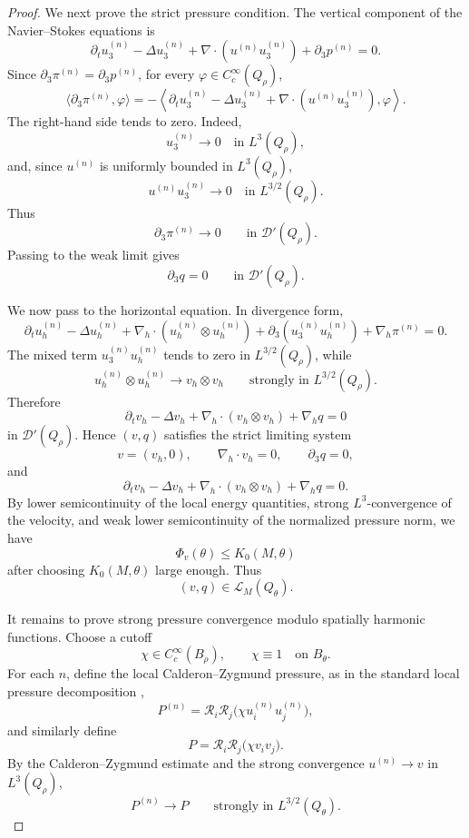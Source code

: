 \documentclass[11pt]{article}
\numberwithin{equation}{section}
\theoremstyle{plain}
\theoremstyle{definition}
\theoremstyle{remark}
\newcommand{\nabh}{\nabla_h}
\newcommand{\divh}{\nabla_h\!\cdot}
\newcommand{\calL}{\mathcal L}
\newcommand{\calR}{\mathcal R}
\begin{document}
\begin{proof}
We next prove the strict pressure condition.  The vertical component of the Navier--Stokes equations is
\[
        \partial_tu^{(n)}_3-\Delta u^{(n)}_3
        +\nabla\cdot(u^{(n)}u^{(n)}_3)
        +\partial_3p^{(n)}=0 .
\]
Since \(\partial_3\pi^{(n)}=\partial_3p^{(n)}\), for every \(\varphi\in C_c^\infty(Q_\rho)\),
\[
        \langle \partial_3\pi^{(n)},\varphi\rangle
        =
        -\left\langle
        \partial_tu^{(n)}_3-\Delta u^{(n)}_3
        +\nabla\cdot(u^{(n)}u^{(n)}_3),
        \varphi
        \right\rangle .
\]
The right-hand side tends to zero.  Indeed,
\[
        u^{(n)}_3\to0 \quad\text{in }L^3(Q_\rho),
\]
and, since \(u^{(n)}\) is uniformly bounded in \(L^3(Q_\rho)\),
\[
        u^{(n)}u^{(n)}_3\to0
        \quad\text{in }L^{3/2}(Q_\rho).
\]
Thus
\[
        \partial_3\pi^{(n)}\to0
        \qquad\text{in }\mathcal D'(Q_\rho).
\]
Passing to the weak limit gives
\[
        \partial_3q=0
        \qquad\text{in }\mathcal D'(Q_\rho).
\]

We now pass to the horizontal equation.  In divergence form,
\[
        \partial_tu^{(n)}_h-\Delta u^{(n)}_h
        +\divh(u^{(n)}_h\otimes u^{(n)}_h)
        +\partial_3(u^{(n)}_3u^{(n)}_h)
        +\nabh\pi^{(n)}=0 .
\]
The mixed term \(u^{(n)}_3u^{(n)}_h\) tends to zero in \(L^{3/2}(Q_\rho)\), while
\[
        u^{(n)}_h\otimes u^{(n)}_h
        \to
        v_h\otimes v_h
        \qquad\text{strongly in }L^{3/2}(Q_\rho).
\]
Therefore
\[
        \partial_tv_h-\Delta v_h
        +\divh(v_h\otimes v_h)
        +\nabh q=0
\]
in \(\mathcal D'(Q_\rho)\).  Hence \((v,q)\) satisfies the strict limiting system
\[
        v=(v_h,0),
        \qquad
        \divh v_h=0,
        \qquad
        \partial_3q=0,
\]
and
\[
        \partial_tv_h-\Delta v_h
        +\divh(v_h\otimes v_h)
        +\nabh q=0 .
\]
By lower semicontinuity of the local energy quantities, strong \(L^3\)-convergence of the velocity, and weak lower semicontinuity of the normalized pressure norm, we have
\[
        \Phi_v(\theta)\le K_0(M,\theta)
\]
after choosing \(K_0(M,\theta)\) large enough.  Thus
\[
        (v,q)\in\calL_M(Q_\theta).
\]

It remains to prove strong pressure convergence modulo spatially harmonic functions.  Choose a cutoff
\[
        \chi\in C_c^\infty(B_\rho),
        \qquad
        \chi\equiv1 \quad\text{on }B_\theta .
\]
For each \(n\), define the local Calderon--Zygmund pressure, as in the standard local pressure decomposition \cite{SohrWahl1986,Seregin2015,Wolf2017},
\[
        P^{(n)}
        =\calR_i\calR_j\bigl(\chi u^{(n)}_iu^{(n)}_j\bigr),
\]
and similarly define
\[
        P=\calR_i\calR_j\bigl(\chi v_iv_j\bigr).
\]
By the Calderon--Zygmund estimate and the strong convergence \(u^{(n)}\to v\) in \(L^3(Q_\rho)\),
\[
        P^{(n)}\to P
        \qquad\text{strongly in }L^{3/2}(Q_\theta).
\]


\end{proof}
\end{document}
